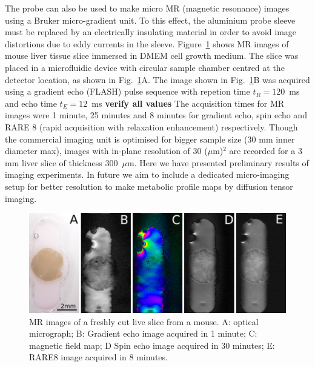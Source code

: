 \documentclass[preprint,12pt]{article}
\newcommand{\todo}[1]{{\color{red}\textbf{#1}}}
\newcommand{\fig}[1]{Fig.~\ref{#1}}
\begin{document}
The probe can also be used to make micro MR (magnetic resonance) images using a Bruker micro-gradient  unit. 
To this effect, the aluminium probe sleeve must be replaced by an electrically insulating material in order to 
avoid image distortions due to eddy currents in the sleeve. 
Figure~\ref{fig:tisli} shows MR images of mouse liver tissue slice 
immersed in DMEM cell growth medium.
The slice was placed in a microfluidic device with circular sample chamber centred at the detector location, as 
shown in \fig{fig:tisli}A. 
The image shown in \fig{fig:tisli}B was acquired using a gradient echo (FLASH) pulse sequence with repetion time
$t_R=120$~ms and echo time $t_E=12$~ms \todo{verify all values}
The acquisition times for MR images were 1 minute, 25 minutes and 8 minutes for gradient echo, spin echo and RARE 8 (rapid acquisition with relaxation enhancement) respectively. Though the commercial imaging unit is optimised for bigger sample size (30 mm inner diameter max), images with in-plane resolution of 30 ($\mu$m)$^{2}$ are recorded for a 3 mm liver slice of thickness 300~$\mu$m. Here we have presented preliminary results of imaging experiments. In future we aim to include a dedicated micro-imaging setup for better resolution to make metabolic profile maps by diffusion tensor imaging.

\begin{figure}
\centering
\includegraphics[width=.7\linewidth,keepaspectratio=true]{./figures/ms5n17-tisli-im-180511.png} 
\caption{MR images of a freshly cut live slice from a mouse. A: optical micrograph; B: Gradient echo image acquired in 1 minute; C: magnetic field map; D Spin echo image acquired in 30 minutes; E: RARE8 image acquired in 8 minutes.}
\label{fig:tisli} 
\end{figure}
\end{document}
